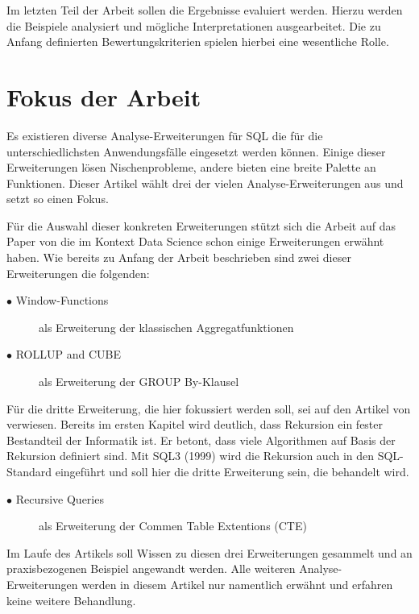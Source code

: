 Im letzten Teil der Arbeit sollen die Ergebnisse evaluiert werden. Hierzu werden
die Beispiele analysiert und mögliche Interpretationen ausgearbeitet. Die zu Anfang
definierten Bewertungskriterien spielen hierbei eine wesentliche Rolle.

\section{Fokus der Arbeit}
Es existieren diverse Analyse-Erweiterungen für SQL die für die unterschiedlichsten
Anwendungsfälle eingesetzt werden können. Einige dieser Erweiterungen lösen
Nischenprobleme, andere bieten eine breite Palette an Funktionen. Dieser Artikel
wählt drei der vielen Analyse-Erweiterungen aus und setzt so einen Fokus.

Für die Auswahl dieser konkreten Erweiterungen stützt sich die Arbeit auf das
Paper von \cite{FOTACHE2015243} die im Kontext Data Science schon einige
Erweiterungen erwähnt haben. Wie bereits zu Anfang der Arbeit beschrieben sind zwei
dieser Erweiterungen die folgenden:

\begin{description}
	\item[$\bullet$ Window-Functions] als Erweiterung der klassischen Aggregatfunktionen

	\item[$\bullet$ ROLLUP and CUBE] als Erweiterung der GROUP By-Klausel
\end{description}

Für die dritte Erweiterung, die hier fokussiert werden soll, sei auf den Artikel
von \cite{4460710} verwiesen. Bereits im ersten Kapitel wird deutlich, dass
Rekursion ein fester Bestandteil der Informatik ist. Er betont, dass viele
Algorithmen auf Basis der Rekursion definiert sind. Mit SQL3 (1999) wird die Rekursion
auch in den SQL-Standard eingeführt und soll hier die dritte Erweiterung sein,
die behandelt wird.

\begin{description}
	\item[$\bullet$ Recursive Queries] als Erweiterung der Commen Table Extentions
		(CTE)
\end{description}

Im Laufe des Artikels soll Wissen zu diesen drei Erweiterungen gesammelt und an praxisbezogenen
Beispiel angewandt werden. Alle weiteren Analyse-Erweiterungen werden in diesem
Artikel nur namentlich erwähnt und erfahren keine weitere Behandlung.